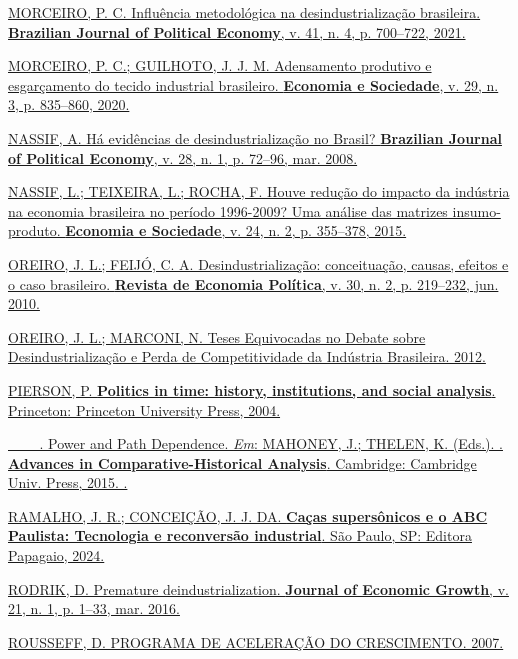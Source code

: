 {{\href{https://www.zotero.org/google-docs/?p3HTgZ}{MORCEIRO, P. C.
Influência metodológica na desindustrialização brasileira.
\textbf{Brazilian Journal of Political Economy}, v. 41, n. 4, p.
700--722, 2021.}

\href{https://www.zotero.org/google-docs/?p3HTgZ}{MORCEIRO, P. C.;
GUILHOTO, J. J. M. Adensamento produtivo e esgarçamento do tecido
industrial brasileiro. \textbf{Economia e Sociedade}, v. 29, n. 3, p.
835--860, 2020.}

\href{https://www.zotero.org/google-docs/?p3HTgZ}{NASSIF, A. Há
evidências de desindustrialização no Brasil? \textbf{Brazilian Journal
of Political Economy}, v. 28, n. 1, p. 72--96, mar. 2008.}

\href{https://www.zotero.org/google-docs/?p3HTgZ}{NASSIF, L.; TEIXEIRA,
L.; ROCHA, F. Houve redução do impacto da indústria na economia
brasileira no período 1996-2009? Uma análise das matrizes
insumo-produto. \textbf{Economia e Sociedade}, v. 24, n. 2, p. 355--378,
2015.}

\href{https://www.zotero.org/google-docs/?p3HTgZ}{OREIRO, J. L.; FEIJÓ,
C. A. Desindustrialização: conceituação, causas, efeitos e o caso
brasileiro. \textbf{Revista de Economia Política}, v. 30, n. 2, p.
219--232, jun. 2010.}

\href{https://www.zotero.org/google-docs/?p3HTgZ}{OREIRO, J. L.;
MARCONI, N. Teses Equivocadas no Debate sobre Desindustrialização e
Perda de Competitividade da Indústria Brasileira. 2012.}

\href{https://www.zotero.org/google-docs/?p3HTgZ}{PIERSON, P.
\textbf{Politics in time: history, institutions, and social analysis}.
Princeton: Princeton University Press, 2004.}

\href{https://www.zotero.org/google-docs/?p3HTgZ}{\_\_\_. Power and Path
Dependence. \emph{Em}: MAHONEY, J.; THELEN, K. (Eds.). .
\textbf{Advances in Comparative-Historical Analysis}. Cambridge:
Cambridge Univ. Press, 2015. .}

\href{https://www.zotero.org/google-docs/?p3HTgZ}{RAMALHO, J. R.;
CONCEIÇÃO, J. J. DA. \textbf{Caças supersônicos e o ABC Paulista:
Tecnologia e reconversão industrial}. São Paulo, SP: Editora Papagaio,
2024.}

\href{https://www.zotero.org/google-docs/?p3HTgZ}{RODRIK, D. Premature
deindustrialization. \textbf{Journal of Economic Growth}, v. 21, n. 1,
p. 1--33, mar. 2016.}

\href{https://www.zotero.org/google-docs/?p3HTgZ}{ROUSSEFF, D. PROGRAMA
DE ACELERAÇÃO DO CRESCIMENTO. 2007.}

}}
